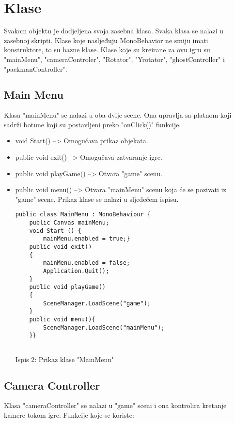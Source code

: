 \section{Klase}
Svakom objektu je dodjeljena svoja zasebna klasa. Svaka klasa se nalazi u zasebnoj skripti. Klase koje nasljeđuju MonoBehavior ne smiju imati konstruktore, to su bazne klase.
Klase koje su kreirane za ovu igru su "mainMenu", "cameraControler", "Rotator", "Yrotator", "ghostController" i "packmanController".


\subsection{Main Menu}
Klasa "mainMenu" se nalazi u oba dvije scene. Ona upravlja sa platnom koji sadrži botune koji su postavljeni preko "onClick()" funkcije.
\begin{itemize}
\item void Start() --> Omogučava prikaz objekata.

\item public void exit() -->  Omogučava zatvaranje igre.

\item public void playGame() --> Otvara "game" scenu.
 

\item public void menu() --> Otvara "mainMenu" scenu koja će se pozivati iz "game" scene. Prikaz klase se nalazi u sljedečem ispisu.


\begin{verbatim}
public class MainMenu : MonoBehaviour {
	public Canvas mainMenu;
	void Start () {
		mainMenu.enabled = true;}
	public void exit()
	{
		mainMenu.enabled = false;
		Application.Quit();
	}
	public void playGame()
	{
		SceneManager.LoadScene("game");
	}
	public void menu(){
		SceneManager.LoadScene("mainMenu");
	}}


\end{verbatim}
\begin{center}
	
	Ispis 2: Prikaz klase "MainMenu"
\end{center}
\end{itemize}



\subsection{Camera Controller}

Klasa "cameraController" se nalazi u "game" sceni i ona kontrolira kretanje kamere tokom igre. Funkcije koje se koriste:

